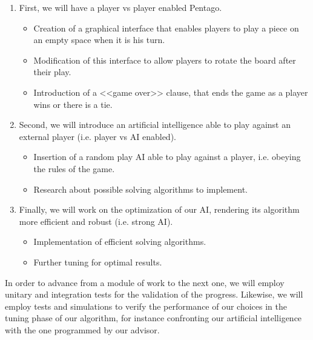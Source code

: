 \begin{enumerate}
  \item First, we will have a player vs player enabled Pentago.
  		\begin{itemize}
  		  \item Creation of a graphical interface that enables players to play a
  		  piece on an empty space when it is his turn.

  		  \item Modification of this interface to allow players to rotate the board
  		  after their play.
  		  
  		  \item Introduction of a <<game over>> clause, that ends the game as a
  		  player wins or there is a tie.
  		\end{itemize}
  		
  	\item Second, we will introduce an artificial intelligence able to play
  	against an external player (i.e. player vs AI enabled).
  		\begin{itemize}
  		  \item Insertion of a random play AI able to play against a player, i.e.
  		  obeying the rules of the game.
  		  \item Research about possible solving algorithms to implement.
  		\end{itemize}
  		 
  	\item Finally, we will work on the optimization of our AI, rendering its
  	algorithm more efficient and robust (i.e. strong AI).
  		\begin{itemize}
  		  \item Implementation of efficient solving algorithms.
  		  \item Further tuning for optimal results.  
  		\end{itemize}
\end{enumerate}

In order to advance from a module of work to the next one, we will employ
unitary and integration tests for the validation of the progress. Likewise, we
will employ tests and simulations to verify the performance of our choices in
the tuning phase of our algorithm, for instance confronting our artificial
intelligence with the one programmed by our advisor.

\newpage
